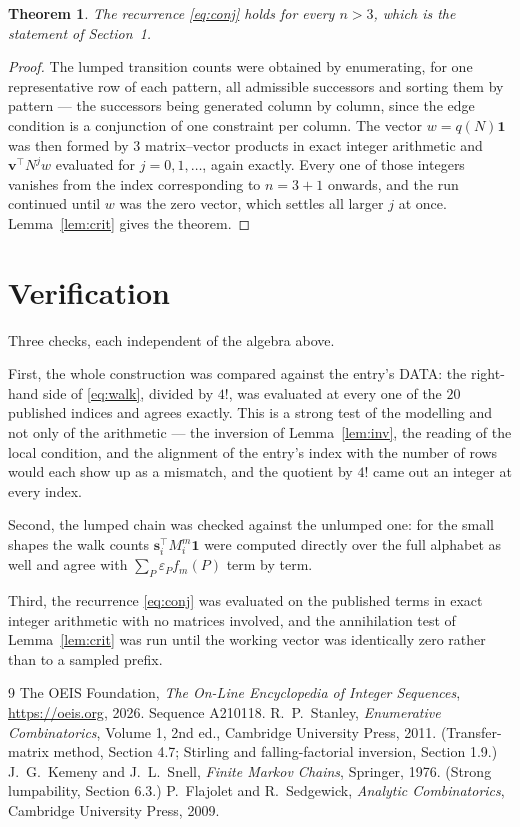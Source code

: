 \documentclass[11pt,a4paper]{article}
\theoremstyle{plain}
\newtheorem{theorem}{Theorem}
\theoremstyle{definition}
\begin{document}
\begin{theorem}
The recurrence \eqref{eq:conj} holds for every $n>3$, which is the statement of
Section~1.
\end{theorem}

\begin{proof}
The lumped transition counts were obtained by enumerating, for one representative row of
each pattern, all admissible successors and sorting them by pattern --- the successors being
generated column by column, since the edge condition is a conjunction of one constraint per
column. The vector $w=q(N)\mathbf{1}$ was then formed by $3$ matrix--vector products
in exact integer arithmetic and $\mathbf{v}^{\!\top}N^{j}w$ evaluated for
$j=0,1,\dots$, again exactly. Every one of those integers vanishes from the index
corresponding to $n=3+1$ onwards, and the run continued until $w$ was the zero vector,
which settles all larger $j$ at once. Lemma~\ref{lem:crit} gives the theorem.
\end{proof}

\section{Verification}

Three checks, each independent of the algebra above.

First, the whole construction was compared against the entry's DATA: the right-hand side of
\eqref{eq:walk}, divided by $4!$, was evaluated at every one of the $20$
published indices and agrees exactly. This is a strong test of the modelling and not only of
the arithmetic --- the inversion of Lemma~\ref{lem:inv}, the reading of the local
condition, and the alignment of the entry's index with the number of rows would each
show up as a mismatch, and the quotient by $4!$ came out an integer at every index.

Second, the lumped chain was checked against the unlumped one: for the small shapes the walk
counts $\mathbf{s}_i^{\!\top}M_i^{m}\mathbf{1}$ were computed directly over the full
alphabet as well and agree with $\sum_P\varepsilon_Pf_m(P)$ term by term.

Third, the recurrence \eqref{eq:conj} was evaluated on the published terms in exact integer
arithmetic with no matrices involved, and the annihilation test of Lemma~\ref{lem:crit} was
run until the working vector was identically zero rather than to a sampled prefix.

\begin{thebibliography}{9}
 The OEIS Foundation, \emph{The On-Line Encyclopedia of Integer
Sequences}, \url{https://oeis.org}, 2026. Sequence A210118.
 R.~P.~Stanley, \emph{Enumerative Combinatorics}, Volume 1, 2nd ed.,
Cambridge University Press, 2011. (Transfer-matrix method, Section 4.7; Stirling and
falling-factorial inversion, Section 1.9.)
 J.~G.~Kemeny and J.~L.~Snell, \emph{Finite Markov Chains}, Springer,
1976. (Strong lumpability, Section 6.3.)
 P.~Flajolet and R.~Sedgewick, \emph{Analytic Combinatorics}, Cambridge
University Press, 2009.
\end{thebibliography}
\end{document}
